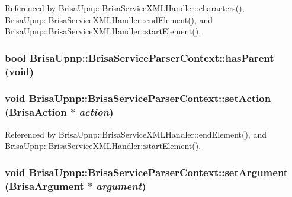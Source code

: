 Referenced by BrisaUpnp::BrisaServiceXMLHandler::characters(), BrisaUpnp::BrisaServiceXMLHandler::endElement(), and BrisaUpnp::BrisaServiceXMLHandler::startElement().\hypertarget{classBrisaUpnp_1_1BrisaServiceParserContext_ac1dcc34e13525285d80d8a0a845dea07}{
\subsubsection[{hasParent}]{\setlength{\rightskip}{0pt plus 5cm}bool BrisaUpnp::BrisaServiceParserContext::hasParent (void)}}
\label{classBrisaUpnp_1_1BrisaServiceParserContext_ac1dcc34e13525285d80d8a0a845dea07}
\hypertarget{classBrisaUpnp_1_1BrisaServiceParserContext_adb385461be17908cd774aa09f89ffe14}{
\subsubsection[{setAction}]{\setlength{\rightskip}{0pt plus 5cm}void BrisaUpnp::BrisaServiceParserContext::setAction ({\bf BrisaAction} $\ast$ {\em action})}}
\label{classBrisaUpnp_1_1BrisaServiceParserContext_adb385461be17908cd774aa09f89ffe14}


Referenced by BrisaUpnp::BrisaServiceXMLHandler::endElement(), and BrisaUpnp::BrisaServiceXMLHandler::startElement().\hypertarget{classBrisaUpnp_1_1BrisaServiceParserContext_af831b6197718043243829205aac8bdae}{
\subsubsection[{setArgument}]{\setlength{\rightskip}{0pt plus 5cm}void BrisaUpnp::BrisaServiceParserContext::setArgument ({\bf BrisaArgument} $\ast$ {\em argument})}}
\label{classBrisaUpnp_1_1BrisaServiceParserContext_af831b6197718043243829205aac8bdae}


